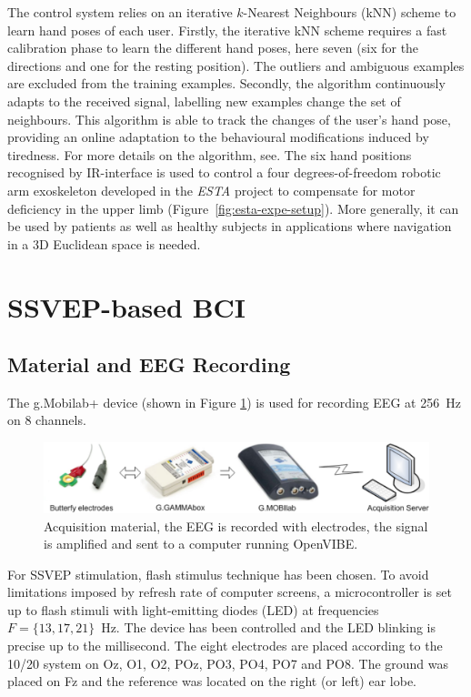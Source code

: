 The control system relies on an iterative $k$-Nearest Neighbours (kNN) scheme to learn hand poses of each user. 
Firstly, the iterative kNN scheme requires a fast calibration phase to learn the different hand poses, here seven (six for the directions and one for the resting position). 
The outliers and ambiguous examples are excluded from the training examples.
Secondly, the algorithm continuously adapts to the received signal, labelling new examples change the  set of neighbours.
This algorithm is able to track the changes of the user's hand pose, providing an online adaptation to the behavioural modifications induced by tiredness. 
For more details on the algorithm, see\citep{martin_fast_2012}.
The six hand positions recognised by IR-interface is used to control a four degrees-of-freedom robotic arm exoskeleton developed in the \emph{ESTA} project \citep{baklouti_force_2008} to compensate for motor deficiency in the upper limb (Figure~\ref{fig:esta-expe-setup}). 
More generally, it can be used by patients as well as healthy subjects in applications where navigation in a 3D Euclidean space is needed.  

\section{SSVEP-based BCI}
\label{sec:ssvep-bci}

\subsection{Material and EEG Recording}
\label{subsec:material-recording}
The g.Mobilab+ device (shown in Figure \ref{fig:acquisition-system}) is used for recording EEG at 256~Hz on 8 channels.

\begin{figure}[!h]
    \centering
    \includegraphics[width=0.8\columnwidth]{Figures/acquisition-system.pdf}
    \caption{\footnotesize{Acquisition material, the EEG is recorded with electrodes, the signal is amplified and sent to a computer running OpenVIBE.}}
    \label{fig:acquisition-system}
\end{figure}

For SSVEP stimulation, flash stimulus technique has been chosen. 
To avoid limitations imposed by refresh rate of computer screens, a microcontroller is set up to  flash stimuli with light-emitting diodes (LED) at frequencies $F =\{13, 17, 21\}$~Hz. %
The device has been controlled and the LED blinking is precise up to the millisecond.
The eight electrodes are placed according to the 10/20 system on Oz, O1, O2, POz, PO3, PO4, PO7 and PO8. 
The ground was placed on Fz and the reference was located on the right (or left) ear lobe.

